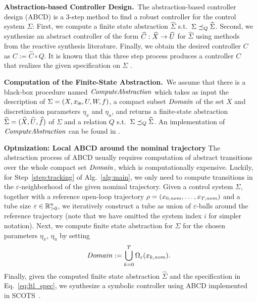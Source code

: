 \smallskip
\noindent\textbf{Abstraction-based Controller Design.}\
The abstraction-based controller design (ABCD) \cite{reissig2016feedback} is a $3$-step method to find a robust controller for the control system $\Sigma$:
First, we compute a finite state abstraction $\widehat{\Sigma}$ s.t.\ $\Sigma \preceq_{Q} \widehat{\Sigma}$.
Second, we synthesize an abstract controller of the form $\widehat{C}:\widehat{X}\rightarrow \widehat{U}$ for $\widehat{\Sigma}$ using methods from the reactive synthesis literature.
Finally, we obtain the desired controller $C$ as $C:=\widehat{C}\circ Q$.
It is known that this three step process produces a controller $C$ that realizes the given specification on $\Sigma$ \cite{reissig2016feedback}.


\smallskip
\noindent\textbf{Computation of the Finite-State Abstraction.}\
We assume that there is a black-box procedure named $\mathit{ComputeAbstraction}$ which takes as input the description of $\Sigma = (X,x_{\mathsf{in}},U,W,f)$, a compact subset $\mathit{Domain}$ of the set $X$ and discretization parameters $\eta_x$ and $\eta_u$, and returns a finite-state abstraction $\widehat{\Sigma} = (\widehat{X},\widehat{U},\widehat{f})$ of $\Sigma$ and a relation $Q$ s.t.\ $\Sigma\preceq_{Q} \widehat{\Sigma}$.
An implementation of $\mathit{ComputeAbstraction}$ can be found in \cite{reissig2016feedback}.



\smallskip
\noindent\textbf{Optmization: Local ABCD around the nominal trajectory}\hfill
%
The abstraction process of ABCD usually requires computation of abstract transitions over the whole compact set $\mathit{Domain}$, which is computationally expensive.
Luckily, for Step~\ref{step:tracking} of Alg.~\ref{alg:main}, we only need to compute transitions in the $\varepsilon$-neighborhood of the given nominal trajectory.
Given a control system $\Sigma$, together with a reference open-loop trajectory $\rho=(x_{0,\mathit{nom}},\ldots,x_{T,\mathit{nom}})$ and a tube size $\varepsilon\in \mathbb{R}_{>0}^n$, we iteratively construct a tube as union of $\varepsilon$-balls around the reference trajectory (note that we have omitted  the system index $i$ for simpler notation).
Next, we compute finite state abstraction for $\Sigma$ for the chosen parameters $\eta_x$, $\eta_u$ by setting
\begin{equation*}
Domain:=\bigcup_{k=0}^T\Omega_{\varepsilon}(x_{k,\mathit{nom}}).
\end{equation*}
Finally, given the computed finite state abstraction $\widehat \Sigma$ and the specification in Eq.~\eqref{eq:ltl_spec}, we synthesize a symbolic controller using ABCD implemented in SCOTS~\cite{Rungger2016scots}. %

